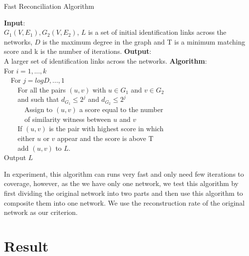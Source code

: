 \documentclass{article}
\begin{document}
\begin{algorithm}[htb]  
  \caption{Fast Reconciliation Algorithm}  
  \label{alg:fra}  
  \textbf{Input}:\\
  $G_1(V,E_1),G_2(V,E_2)$, $L$ is a set of initial identification links across the networks, $D$ is the maximum degree in the graph and T is a minimum matching score and k is the number of iterations.
  \textbf{Output}:\\
  A larger set of identification links across the networks.
  \textbf{Algorithm}: \\
For $i = 1,...,k$\\
\ \ For $j = log D,...,1$\\
\ \ \ \ For all the pairs $(u,v)$ with $u\in G_1$ and $v\in G_2$\\
\ \ \ \ and such that $d_{G_1}\le 2^j$ and $d_{G_2}\le 2^j$\\
\ \ \ \ \ \ Assign to $(u,v)$ a score equal to the number\\
\ \ \ \ \ \ of similarity witness between $u$ and $v$\\
\ \ \ \ If $(u,v)$ is the pair with highest score in which\\
\ \ \ \ either $u$ or $v$ appear and the score is above T\\
\ \ \ \ add $(u,v)$ to $L$.\\
Output $L$\\
\end{algorithm}
In experiment, this algorithm can runs very fast and only need few iterations to coverage, however, as the we have only one network, we test this algorithm by first dividing the original network into two parts and then use this algorithm to composite them into one network. We use the reconstruction rate of the original network as our criterion.\\
\section{Result}
\end{document}
